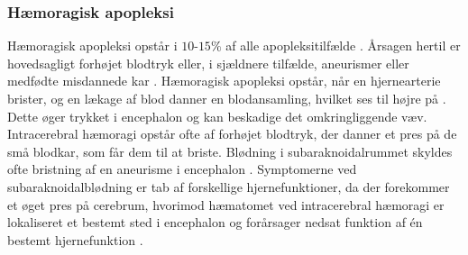 \subsubsection{Hæmoragisk apopleksi}
Hæmoragisk apopleksi opstår i $10$-$15\%$ af alle apopleksitilfælde \cite{Sundhed.dk2014}. Årsagen hertil er hovedsagligt forhøjet blodtryk eller, i sjældnere tilfælde, aneurismer eller medfødte misdannede kar \cite{Schulze2011}. Hæmoragisk apopleksi opstår, når en hjernearterie brister, og en lækage af blod danner en blodansamling, hvilket ses til højre på . Dette øger trykket i encephalon og kan beskadige det omkringliggende væv. \cite{Caplan2006}\\
Intracerebral hæmoragi opstår ofte af forhøjet blodtryk, der danner et pres på de små blodkar, som får dem til at briste. \cite{Caplan2006} Blødning i subaraknoidalrummet skyldes ofte bristning af en aneurisme i encephalon \cite{Schulze2011}. Symptomerne ved subaraknoidalblødning er tab af forskellige hjernefunktioner, da der forekommer et øget pres på cerebrum, hvorimod hæmatomet ved intracerebral hæmoragi er lokaliseret et bestemt sted i encephalon og forårsager nedsat funktion af én bestemt hjernefunktion \cite{Caplan2006}. 

